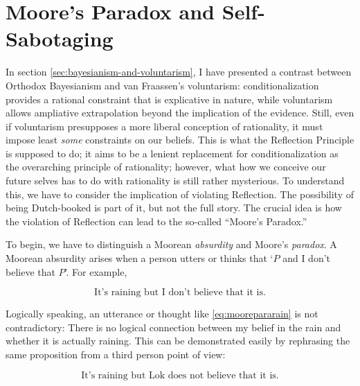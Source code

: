\hypertarget{moores-paradox-and-self-sabotaging}{%
\section{Moore's Paradox and
Self-Sabotaging}\label{sec:moores-paradox-and-self-sabotaging}}

In section \ref{sec:bayesianism-and-voluntarism}, I have presented a contrast between Orthodox Bayesianism and van
Fraassen's voluntarism:  conditionalization provides a
rational constraint that is explicative in nature, while voluntarism
allows ampliative extrapolation beyond the implication of the evidence.
Still, even if voluntarism presupposes a more liberal conception of
rationality, it must impose least \emph{some} constraints on our
beliefs. This is what the Reflection Principle is supposed to do; it
aims to be a lenient replacement for conditionalization as the overarching principle of
rationality; however, what how we conceive our future selves has to do
with rationality is still rather mysterious. To understand this, we have
to consider the implication of violating Reflection. The possibility of
being Dutch-booked is part of it, but not the full story. The crucial
idea is how the violation of Reflection can lead to the so-called
``Moore's Paradox.''

To begin, we have to distinguish a Moorean \emph{absurdity} and Moore's
\emph{paradox}. A Moorean absurdity arises when a person utters or
thinks that `\(P\) and I don't believe that \(P\)'. For example,

\begin{equation}
	\text{It's raining but I don't believe that it is.}
	\label{eq:moorepararain}
\end{equation}
  
Logically speaking, an utterance or thought like \ref{eq:moorepararain} is not contradictory:
There is no logical connection between my belief in the rain and whether
it is actually raining. This can be demonstrated easily by rephrasing
the same proposition from a third person point of view:

\begin{equation}
	\text{It's raining but Lok does not believe that it is.}
	\label{eq:moorepararain3rdperson}
\end{equation}
 

